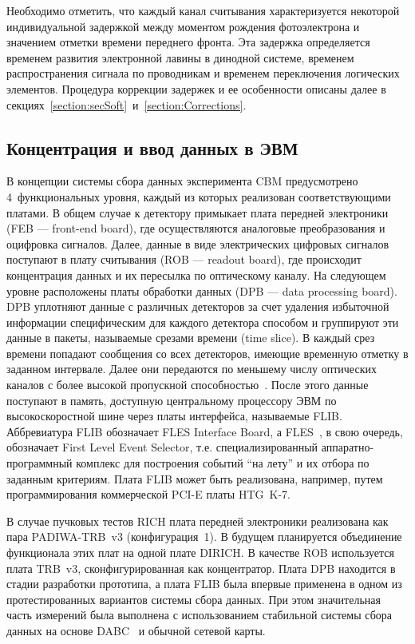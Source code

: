 Необходимо отметить, что каждый канал считывания характеризуется некоторой индивидуальной задержкой между моментом рождения фотоэлектрона и значением отметки времени переднего фронта. Эта задержка определяется временем развития электронной лавины в динодной системе, временем распространения сигнала по проводникам и временем переключения логических элементов. Процедура коррекции задержек и ее особенности описаны далее в секциях~\ref{section:secSoft}~и~\ref{section:Corrections}.

\subsection{Концентрация и ввод данных в ЭВМ}\label{section:secFinalReadout}

В концепции системы сбора данных эксперимента CBM предусмотрено 4~функциональных уровня, каждый из которых реализован соответствующими платами. В общем случае к детектору примыкает плата передней электроники (FEB --- front-end board), где осуществляются аналоговые преобразования и оцифровка сигналов. Далее, данные в виде электрических цифровых сигналов поступают в плату считывания (ROB --- readout board), где происходит концентрация данных и их пересылка по оптическому каналу. На следующем уровне расположены платы обработки данных (DPB --- data processing board). DPB уплотняют данные с различных детекторов за счет удаления избыточной информации специфическим для каждого детектора способом и группируют эти данные в пакеты, называемые срезами времени (time slice). В каждый срез времени попадают сообщения со всех детекторов, имеющие временную отметку в заданном интервале. Далее они передаются по меньшему числу оптических каналов с более высокой пропускной способностью~\cite{DPB}. После этого данные поступают в память, доступную центральному процессору ЭВМ по высокоскоростной шине через платы интерфейса, называемые FLIB. Аббревиатура FLIB обозначает FLES Interface Board, а FLES~\cite{FLES}, в свою очередь, обозначает First Level Event Selector, т.е. специализированный аппаратно-программный комплекс для построения событий ``на лету'' и их отбора по заданным критериям. Плата FLIB может быть реализована, например, путем программирования коммерческой PCI-E платы HTG~K-7.

В случае пучковых тестов RICH плата передней электроники реализована как пара PADIWA-TRB~v3 (конфигурация~1). В будущем планируется объединение функционала этих плат на одной плате DIRICH. В качестве ROB используется плата TRB~v3, сконфигурированная как концентратор. Плата DPB находится в стадии разработки прототипа, а плата FLIB была впервые применена в одном из протестированных вариантов системы сбора данных. При этом значительная часть измерений была выполнена с использованием стабильной системы сбора данных на основе DABC~\cite{DABC} и обычной сетевой карты.
